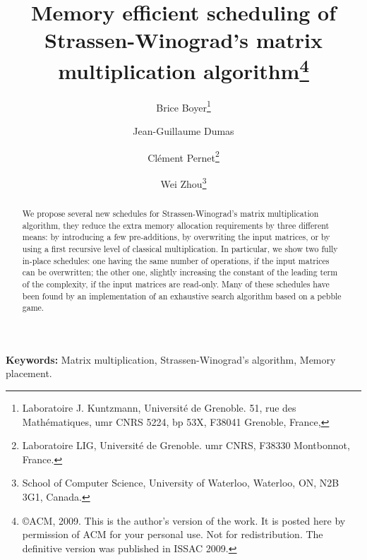 \documentclass{article}
\begin{document}
\title{Memory efficient scheduling of Strassen-Winograd's matrix
  multiplication algorithm\footnote{\copyright ACM, 2009. This is the
    author's version of the work. It is posted here by permission of
    ACM for your personal use. Not for redistribution. The definitive
    version was published in ISSAC 2009.}}
\author{Brice Boyer\thanks{Laboratoire J. Kuntzmann, Universit\'e de
  Grenoble. 51, rue des Math\'ematiques, umr CNRS 5224, bp 53X, F38041
  Grenoble, France, \jgdemail}
\and Jean-Guillaume Dumas\footnotemark[1]
\and Cl\'ement Pernet\thanks{Laboratoire LIG, Universit\'e de
  Grenoble. umr CNRS, F38330 Montbonnot, France. \cpemail}
\and Wei Zhou\thanks{School of Computer Science, University of
  Waterloo, Waterloo, ON, N2B 3G1, Canada. \wzemail}
}
\maketitle

\begin{abstract}
We propose several new schedules for Strassen-Winograd's matrix multiplication algorithm, they reduce the extra memory allocation requirements by three different
means: by introducing a few
pre-additions, by overwriting the input matrices, or by using a
first recursive
level of classical multiplication.
In particular, we show two fully in-place schedules: one having the
same number of
operations, if the input matrices can be overwritten; the other one,
slightly increasing
the constant of the leading term of the complexity, if the input matrices are
read-only. 
Many of these schedules have been found by an implementation of an exhaustive
search algorithm based on a pebble game.
\end{abstract}




\noindent
 {\bf Keywords:} Matrix multiplication, Strassen-Winograd's algorithm, Memory placement.
\end{document}

